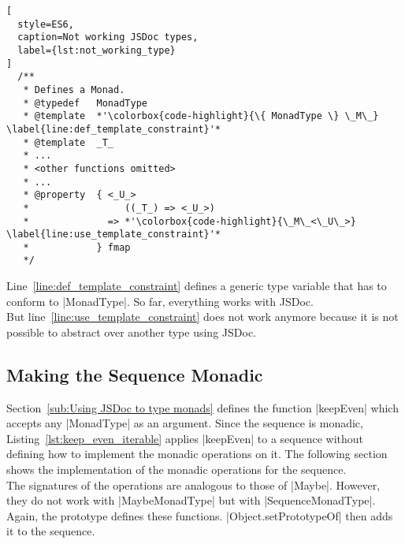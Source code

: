 \begin{lstlisting}[
  style=ES6,
  caption=Not working JSDoc types,
  label={lst:not_working_type}
]
  /**
   * Defines a Monad.
   * @typedef   MonadType
   * @template  *'\colorbox{code-highlight}{\{ MonadType \} \_M\_} \label{line:def_template_constraint}'*
   * @template  _T_
   * ...
   * <other functions omitted>
   * ...
   * @property  { <_U_>
   *                 ((_T_) => <_U_>)
   *              => *'\colorbox{code-highlight}{\_M\_<\_U\_>} \label{line:use_template_constraint}'*
   *            } fmap
   */
\end{lstlisting}

Line~\ref{line:def_template_constraint} defines a generic type variable that
has to conform to |MonadType|. So far, everything works with JSDoc.\\ But
line~\ref{line:use_template_constraint} does not work anymore because it is not
possible to abstract over another type using JSDoc.\\

\subsection{Making the Sequence Monadic} %
\label{sub:Making the Sequence Monadic}
Section~\ref{sub:Using JSDoc to type monads} defines the function |keepEven|
which accepts any |MonadType| as an argument. Since the sequence is monadic,
Listing~\ref{lst:keep_even_iterable} applies |keepEven| to a sequence without
defining how to implement the monadic operations on it. The following section
shows the implementation of the monadic operations for the sequence.\\
The signatures of the operations are analogous to those of |Maybe|. However,
they do not work with |MaybeMonadType| but with |SequenceMonadType|. Again, the
prototype defines these functions. |Object.setPrototypeOf| then adds it to the
sequence.


